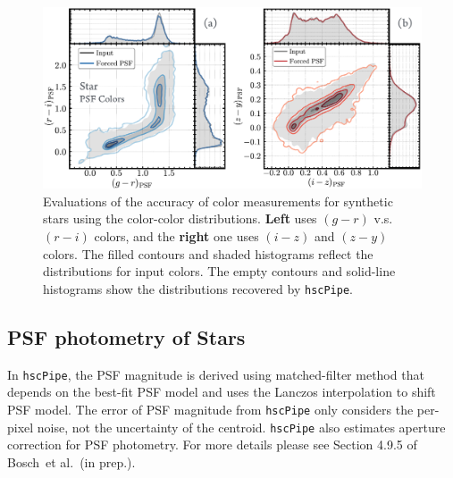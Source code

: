 \documentclass[useamsfonts]{pasj01}
\def\etal{{\ et al.~}}
\def\hscpipe{\texttt{hscPipe}}
\begin{document}
\begin{figure}
    \begin{center}
        \includegraphics[width=\textwidth]{fig/synpipe_psf_cdist}
    \end{center}
    \caption{
        Evaluations of the accuracy of color measurements for synthetic stars using 
        the color-color distributions. 
        \textbf{Left} uses $(g-r)$ v.s. $(r-i)$ colors, and the \textbf{right} one 
        uses $(i-z)$ and $(z-y)$ colors. 
        The filled contours and shaded histograms reflect the distributions for input 
        colors. 
        The empty contours and solid-line histograms show the distributions recovered 
        by \hscpipe{}. 
        }
    \label{fig:psf_cdist}
\end{figure}
 
\subsection{PSF photometry of Stars}
    \label{ssec:psf}
    
    In \hscpipe{}, the PSF magnitude is derived using matched-filter method that 
    depends on the best-fit PSF model and uses the Lanczos interpolation to shift 
    PSF model. 
    The error of PSF magnitude from \hscpipe{} only considers the per-pixel noise, 
    not the uncertainty of the centroid. 
    \hscpipe{} also estimates aperture correction for PSF photometry. 
    For more details please see Section 4.9.5 of Bosch\etal (in prep.). 
        
\end{document}
